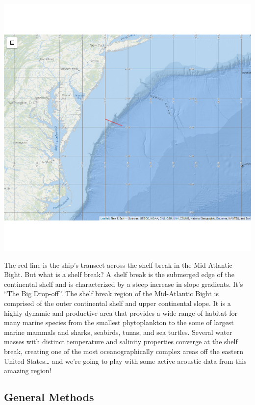 \documentclass[]{article}
\begin{document}
\begin{center}\includegraphics{tut_EK60_038SBF_clean_and_plot_files/figure-latex/unnamed-chunk-1-1} \end{center}

The red line is the ship's transect across the shelf break in the
Mid-Atlantic Bight. But what is a shelf break? A shelf break is the
submerged edge of the continental shelf and is characterized by a steep
increase in slope gradients. It's ``The Big Drop-off''. The shelf break
region of the Mid-Atlantic Bight is comprised of the outer continental
shelf and upper continental slope. It is a highly dynamic and productive
area that provides a wide range of habitat for many marine species from
the smallest phytoplankton to the some of largest marine mammals and
sharks, seabirds, tunas, and sea turtles. Several water masses with
distinct temperature and salinity properties converge at the shelf
break, creating one of the most oceanographically complex areas off the
eastern United States\ldots{} and we're going to play with some active
acoustic data from this amazing region!

\hypertarget{general-methods}{%
\subsection{General Methods}\label{general-methods}}
\end{document}
